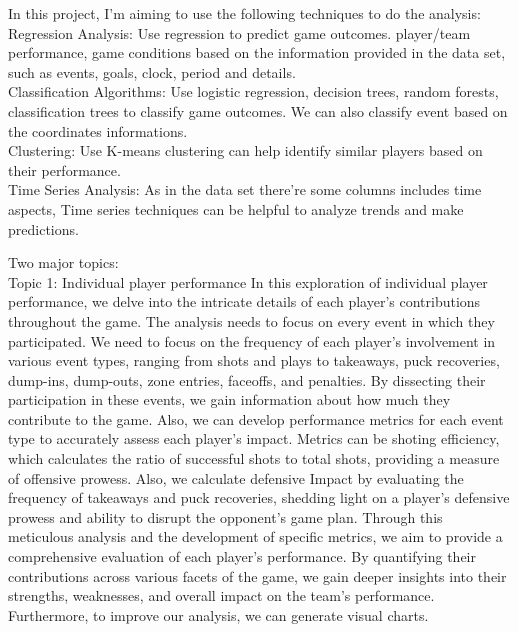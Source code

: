 \documentclass[
  a3paper,
]{article}
\begin{document}
In this project, I'm aiming to use the following techniques to do the
analysis:\\

Regression Analysis: Use regression to predict game outcomes.
player/team performance, game conditions based on the information
provided in the data set, such as events, goals, clock, period and
details.\\

Classification Algorithms: Use logistic regression, decision trees,
random forests, classification trees to classify game outcomes. We can
also classify event based on the coordinates informations.\\

Clustering: Use K-means clustering can help identify similar players
based on their performance.\\

Time Series Analysis: As in the data set there're some columns includes
time aspects, Time series techniques can be helpful to analyze trends
and make predictions. ~

Two major topics:\\

Topic 1: Individual player performance In this exploration of individual
player performance, we delve into the intricate details of each player's
contributions throughout the game. The analysis needs to focus on every
event in which they participated. We need to focus on the frequency of
each player's involvement in various event types, ranging from shots and
plays to takeaways, puck recoveries, dump-ins, dump-outs, zone entries,
faceoffs, and penalties. By dissecting their participation in these
events, we gain information about how much they contribute to the game.
Also, we can develop performance metrics for each event type to
accurately assess each player's impact. Metrics can be shoting
efficiency, which calculates the ratio of successful shots to total
shots, providing a measure of offensive prowess. Also, we calculate
defensive Impact by evaluating the frequency of takeaways and puck
recoveries, shedding light on a player's defensive prowess and ability
to disrupt the opponent's game plan. Through this meticulous analysis
and the development of specific metrics, we aim to provide a
comprehensive evaluation of each player's performance. By quantifying
their contributions across various facets of the game, we gain deeper
insights into their strengths, weaknesses, and overall impact on the
team's performance. Furthermore, to improve our analysis, we can
generate visual charts.\\
\end{document}

